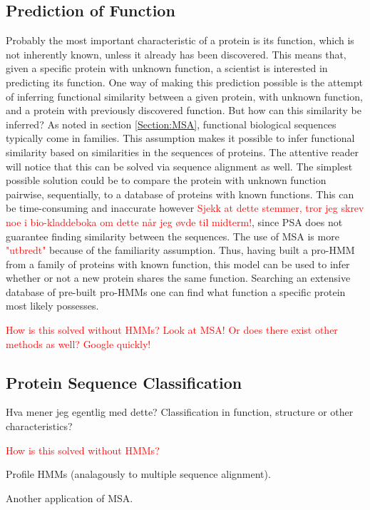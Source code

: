 \documentclass{article}\usepackage[]{graphicx}\usepackage[]{color}
\begin{document}
\subsection{Prediction of Function}\label{Section:ProtPredFunc}
Probably the most important characteristic of a protein is its function, which is not inherently known, unless it already has been discovered. This means that, given a specific protein with unknown function, a scientist is interested in predicting its function. One way of making this prediction possible is the attempt of inferring functional similarity between a given protein, with unknown function, and a protein with previously discovered function. But how can this similarity be inferred? As noted in section \ref{Section:MSA}, functional biological sequences typically come in families. This assumption makes it possible to infer functional similarity based on similarities in the sequences of proteins. The attentive reader will notice that this can be solved via sequence alignment as well. The simplest possible solution could be to compare the protein with unknown function pairwise, sequentially, to a database of proteins with known functions. This can be time-consuming and inaccurate however \textcolor{red}{Sjekk at dette stemmer, tror jeg skrev noe i bio-kladdeboka om dette når jeg øvde til midterm!}, since PSA does not guarantee finding similarity between the sequences. The use of MSA is more \textcolor{red}{"utbredt"} because of the familiarity assumption. Thus, having built a pro-HMM from a family of proteins with known function, this model can be used to infer whether or not a new protein shares the same function. Searching an extensive database of pre-built pro-HMMs one can find what function a specific protein most likely possesses.

\textcolor{red}{How is this solved without HMMs? Look at MSA! Or does there exist other methods as well? Google quickly!}

\subsection{Protein Sequence Classification}\label{Section:ProtSeqClass}
Hva mener jeg egentlig med dette? Classification in function, structure or other characteristics?

\textcolor{red}{How is this solved without HMMs?}

Profile HMMs (analagously to multiple sequence alignment). 

Another application of MSA.
\end{document}
